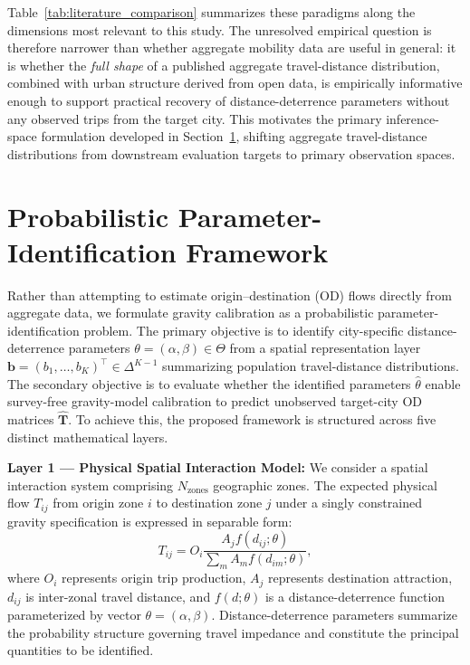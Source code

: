 \documentclass[pdflatex,sn-basic,iicol]{sn-jnl}
\begin{document}
Table~\ref{tab:literature_comparison} summarizes these paradigms along the dimensions most relevant to this study. The unresolved empirical question is therefore narrower than whether aggregate mobility data are useful in general: it is whether the \emph{full shape} of a published aggregate travel-distance distribution, combined with urban structure derived from open data, is empirically informative enough to support practical recovery of distance-deterrence parameters without any observed trips from the target city. This motivates the primary inference-space formulation developed in Section~\ref{sec:probabilistic_framework}, shifting aggregate travel-distance distributions from downstream evaluation targets to primary observation spaces.

\section{Probabilistic Parameter-Identification Framework}\label{sec:probabilistic_framework}

Rather than attempting to estimate origin--destination (OD) flows directly from aggregate data, we formulate gravity calibration as a probabilistic parameter-identification problem. The primary objective is to identify city-specific distance-deterrence parameters $\theta = (\alpha, \beta) \in \Theta$ from a spatial representation layer $\mathbf{b} = (b_1, \dots, b_K)^\top \in \Delta^{K-1}$ summarizing population travel-distance distributions. The secondary objective is to evaluate whether the identified parameters $\hat{\theta}$ enable survey-free gravity-model calibration to predict unobserved target-city OD matrices $\hat{\mathbf{T}}$. To achieve this, the proposed framework is structured across five distinct mathematical layers.

\textbf{Layer 1 — Physical Spatial Interaction Model:} We consider a spatial interaction system comprising $N_{\text{zones}}$ geographic zones. The expected physical flow $T_{ij}$ from origin zone $i$ to destination zone $j$ under a singly constrained gravity specification is expressed in separable form:
\begin{equation}\label{eq:gravity_separable}
T_{ij} = O_i \frac{A_j f(d_{ij}; \theta)}{\sum_{m} A_m f(d_{im}; \theta)},
\end{equation}
where $O_i$ represents origin trip production, $A_j$ represents destination attraction, $d_{ij}$ is inter-zonal travel distance, and $f(d; \theta)$ is a distance-deterrence function parameterized by vector $\theta = (\alpha, \beta)$. Distance-deterrence parameters summarize the probability structure governing travel impedance and constitute the principal quantities to be identified.
\end{document}
